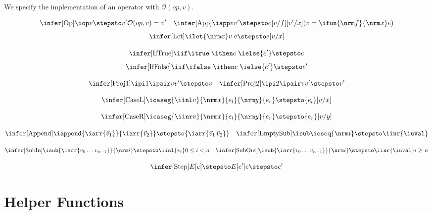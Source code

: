 We specify the implementation of an operator with
$\mathcal{O}({op},v)$. 

\[
\infer[\text{Op}]{
  \iop v \stepsto v'
}{
  \mathcal{O}({op},v) = v'
}
\quad
\infer[\text{App}]{
  \iapp v {v'} \stepsto e[v/f][v'/x]
}{
  (v = \ifun {\nrm f}{\nrm x} e)
}
\]
\[%
\infer[\text{Let}]{
  \ilet {\nrm x} v \; e
  \stepsto e[v/x]
}{}
\]

\[
\infer[\text{{IfTrue}}]{
  \iif \itrue \; \ithen e \; \ielse {e'} \stepsto
  e
}{}
\]
\[%
\infer[\text{{IfFalse}}]{
  \iif \ifalse \; \ithen e \; \ielse {e'} \stepsto
  e'
}{}
\]

\[
\infer[\text{Proj1}]{
  \ipi 1 {\ipair v {v'}} \stepsto v
}{}
\quad
\infer[\text{Proj2}]{
  \ipi 2 {\ipair v {v'}} \stepsto v'
}{}
\]

\[
\infer[\text{CaseL}]{
  \icaseg{\iinl v}{\nrm x}{e_l}{\nrm y}{e_r}
  \stepsto {e_l}[v/x]
}{}
\]

\[%
\infer[\text{CaseR}]{
  \icaseg{\iinr v}{\nrm x}{e_l}{\nrm y}{e_r}
  \stepsto {e_r}[v/y]
}{}
\]

\[
\infer[\text{Append}]{
  \iappend {\iarr{\vec v_1}} {\iarr{\vec v_2}} \stepsto
  {\iarr{\vec v_1 \, \vec v_2}}
}{}
\quad
\infer[\text{EmptySub}]{
  \isub \ieseq {\nrm i} \stepsto \iinr{\iuval}
}{}
\]

\[
\infer[\text{SubIn}]{
  \isub {\iarr{v_0 \ldots v_{n-1}}} {\nrm i}
  \stepsto \iinl {v_{i}}
}{
  0 \leq i < n
}
\quad
\infer[\text{SubOut}]{
  \isub {\iarr{v_0 \ldots v_{n-1}}} {\nrm i}
  \stepsto \iinr{\iuval}
}{
  i \geq n
}
\]

\[
\infer[\text{Step}]{
  E[e] \stepsto E[e']
}{
  e \stepsto e'
}
\]

\section{Helper Functions}
\label{app:asst-functions}


